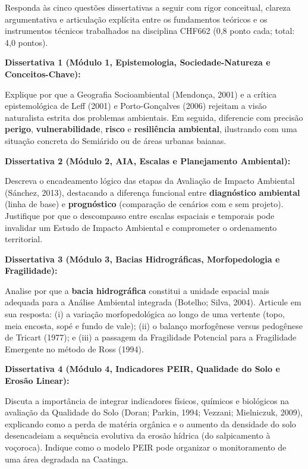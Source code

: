\noindent Responda às cinco questões dissertativas a seguir com rigor conceitual, clareza argumentativa e articulação explícita entre os fundamentos teóricos e os instrumentos técnicos trabalhados na disciplina CHF662 (0,8 ponto cada; total: 4,0 pontos).

\vspace{6pt}
\noindent\textbf{Dissertativa 1 (Módulo 1, Epistemologia, Sociedade-Natureza e Conceitos-Chave):}\par
Explique por que a Geografia Socioambiental (Mendonça, 2001) e a crítica epistemológica de Leff (2001) e Porto-Gonçalves (2006) rejeitam a visão naturalista estrita dos problemas ambientais. Em seguida, diferencie com precisão \textbf{perigo}, \textbf{vulnerabilidade}, \textbf{risco} e \textbf{resiliência ambiental}, ilustrando com uma situação concreta do Semiárido ou de áreas urbanas baianas.
\espacoResolucao[3.2cm]

\noindent\textbf{Dissertativa 2 (Módulo 2, AIA, Escalas e Planejamento Ambiental):}\par
Descreva o encadeamento lógico das etapas da Avaliação de Impacto Ambiental (Sánchez, 2013), destacando a diferença funcional entre \textbf{diagnóstico ambiental} (linha de base) e \textbf{prognóstico} (comparação de cenários com e sem projeto). Justifique por que o descompasso entre escalas espaciais e temporais pode invalidar um Estudo de Impacto Ambiental e comprometer o ordenamento territorial.
\espacoResolucao[3.2cm]

\noindent\textbf{Dissertativa 3 (Módulo 3, Bacias Hidrográficas, Morfopedologia e Fragilidade):}\par
Analise por que a \textbf{bacia hidrográfica} constitui a unidade espacial mais adequada para a Análise Ambiental integrada (Botelho; Silva, 2004). Articule em sua resposta: (i) a variação morfopedológica ao longo de uma vertente (topo, meia encosta, sopé e fundo de vale); (ii) o balanço morfogênese versus pedogênese de Tricart (1977); e (iii) a passagem da Fragilidade Potencial para a Fragilidade Emergente no método de Ross (1994).
\espacoResolucao[3.2cm]

\noindent\textbf{Dissertativa 4 (Módulo 4, Indicadores PEIR, Qualidade do Solo e Erosão Linear):}\par
Discuta a importância de integrar indicadores físicos, químicos e biológicos na avaliação da Qualidade do Solo (Doran; Parkin, 1994; Vezzani; Mielniczuk, 2009), explicando como a perda de matéria orgânica e o aumento da densidade do solo desencadeiam a sequência evolutiva da erosão hídrica (do salpicamento à voçoroca). Indique como o modelo PEIR pode organizar o monitoramento de uma área degradada na Caatinga.
\espacoResolucao[3.2cm]

